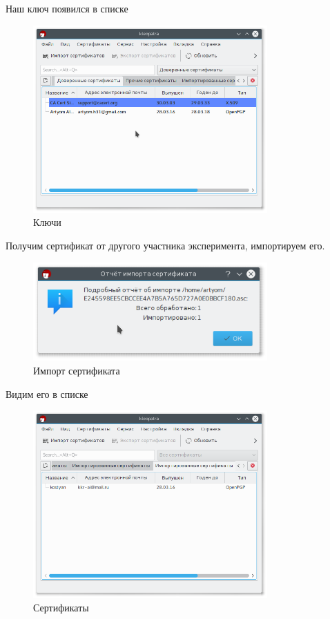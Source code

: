 Наш ключ появился в списке

\begin{figure}[H]
	\centering
	\includegraphics[width=0.8\textwidth]{figures/screen9.png}
	\caption{Ключи}
\end{figure}

Получим сертификат от другого участника эксперимента, импортируем его.

\begin{figure}[H]
	\centering
	\includegraphics[width=0.8\textwidth]{figures/screen8.png}
	\caption{Импорт сертификата}
\end{figure}

Видим его в списке

\begin{figure}[H]
	\centering
	\includegraphics[width=0.8\textwidth]{figures/screen17.png}
	\caption{Сертификаты}
\end{figure}


